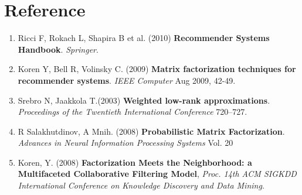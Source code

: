 \documentclass[11pt]{article}
\theoremstyle{definition}
\begin{document}
\newpage
\section*{\textbf{Reference}}
\begin{enumerate}
\item \label{ref:handbook}
Ricci F, Rokach L, Shapira B et al. (2010) \textbf{Recommender Systems Handbook}. \textit{Springer}. 
\item \label{ref:MFieee}
Koren Y, Bell R, Volinsky C. (2009) \textbf{Matrix factorization techniques for recommender systems}. \textit{IEEE Computer} Aug 2009, 42-49. 
\item \label{ref:WLA}
Srebro N,  Jaakkola T.(2003) \textbf{Weighted low-rank approximations}. \textit{Proceedings of the Twentieth International Conference} 720–727.
\item \label{ref:PMF}
R Salakhutdinov, A Mnih. (2008) \textbf{Probabilistic Matrix Factorization}. \textit{Advances in Neural Information Processing Systems} Vol. 20

\item \label{ref:implicit}
Koren, Y. (2008) \textbf{Factorization Meets the Neighborhood: a Multifaceted Collaborative Filtering Model}, \textit{Proc. 14th ACM SIGKDD International Conference on Knowledge Discovery and
Data Mining}.

\end{enumerate}
\end{document}
